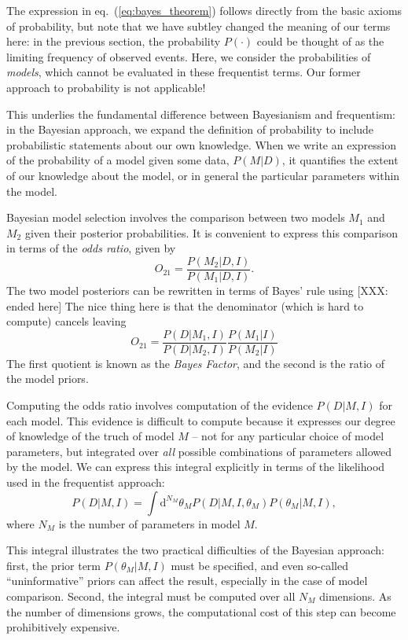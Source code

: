\documentclass[12pt,pdftex]{article}
\newcommand{\comment}[1]{{\color{red} [#1]}}
\newcommand{\dd}{\mathrm{d}}
\newcommand{\eqn}[1]{eq.~(\ref{eq:#1})}
\begin{document}
The expression in \eqn{bayes_theorem} follows directly from the basic axioms
of probability, but note that
we have subtley changed the meaning of our terms here:
in the previous section, the probability
$P(\cdot)$ could be thought of as the limiting frequency of observed events.
Here, we consider the probabilities of {\it models}, which cannot be evaluated
in these frequentist terms.
Our former approach to probability is not applicable!

This underlies the fundamental difference between Bayesianism and frequentism:
in the Bayesian approach, we expand the definition of probability to include
probabilistic statements about our own knowledge.  When we write an expression
of the probability of a model given some data, $P(M|D)$, it quantifies the
extent of our knowledge about the model, or in general the particular
parameters within the model.

Bayesian model selection involves the comparison between two models $M_1$
and $M_2$ given their posterior probabilities.  It is convenient to express
this comparison in terms of the {\it odds ratio}, given by
\begin{equation}
  \label{eq:odds_ratio}
  O_{21} = \frac{P(M_2|D,I)}{P(M_1|D,I)}.
\end{equation}
The two model posteriors can be rewritten in terms of Bayes' rule using
\comment{XXX: ended here}
The nice thing here is that the denominator (which is hard to compute) cancels
leaving
\begin{equation}
  O_{21} = \frac{P(D|M_1,I)}{P(D|M_2,I)}\frac{P(M_1|I)}{P(M_2|I)}
\end{equation}
The first quotient is known as the {\it Bayes Factor}, and the second is the
ratio of the model priors.

Computing the odds ratio involves computation of the evidence $P(D|M,I)$
for each model.  This evidence is difficult to compute because it expresses
our degree of knowledge of the truch of model $M$ -- not for any
particular choice of model parameters,
but integrated over {\it all} possible combinations of parameters allowed
by the model.  We can express this integral explicitly in terms of the
likelihood used in the frequentist approach:
\begin{equation}
  \label{eq:evidence_integral}
  P(D|M, I) = \int \dd^{N_M}\theta_M P(D|M, I, \theta_M)P(\theta_M|M, I),
\end{equation}
where $N_M$ is the number of parameters in model $M$.

This integral illustrates the two practical difficulties of the Bayesian
approach: first, the prior term $P(\theta_M|M,I)$ must be specified, and
even so-called ``uninformative'' priors can affect the result, especially
in the case of model comparison.  Second, the integral must be computed
over all $N_M$ dimensions.
As the number of dimensions grows, the computational cost of this step
can become prohibitively expensive.
\end{document}
